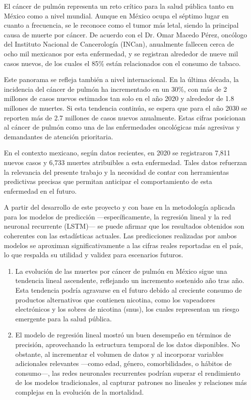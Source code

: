 El cáncer de pulmón representa un reto crítico para la salud pública tanto en México como a nivel mundial. Aunque en México ocupa el séptimo lugar en cuanto a frecuencia, se le reconoce como el tumor más letal, siendo la principal causa de muerte por cáncer. De acuerdo con el Dr. Omar Macedo Pérez, oncólogo del Instituto Nacional de Cancerología (INCan), anualmente fallecen cerca de ocho mil mexicanos por esta enfermedad, y se registran alrededor de nueve mil casos nuevos, de los cuales el 85\% están relacionados con el consumo de tabaco.

Este panorama se refleja también a nivel internacional. En la última década, la incidencia del cáncer de pulmón ha incrementado en un 30\%, con más de 2 millones de casos nuevos estimados tan solo en el año 2020 y alrededor de 1.8 millones de muertes. Si esta tendencia continúa, se espera que para el año 2030 se reporten más de 2.7 millones de casos nuevos anualmente. Estas cifras posicionan al cáncer de pulmón como una de las enfermedades oncológicas más agresivas y demandantes de atención prioritaria.

En el contexto mexicano, según datos recientes, en 2020 se registraron 7,811 nuevos casos y 6,733 muertes atribuibles a esta enfermedad. Tales datos refuerzan la relevancia del presente trabajo y la necesidad de contar con herramientas predictivas precisas que permitan anticipar el comportamiento de esta enfermedad en el futuro.

A partir del desarrollo de este proyecto y con base en la metodología aplicada para los modelos de predicción ---específicamente, la regresión lineal y la red neuronal recurrente (LSTM)--- se puede afirmar que los resultados obtenidos son coherentes con las estadísticas actuales. Las predicciones realizadas por ambos modelos se aproximan significativamente a las cifras reales reportadas en el país, lo que respalda su utilidad y validez para escenarios futuros.

\begin{enumerate}
    \item La evolución de las muertes por cáncer de pulmón en México sigue una tendencia lineal ascendente, reflejando un incremento sostenido año tras año. Esta tendencia podría agravarse en el futuro debido al creciente consumo de productos alternativos que contienen nicotina, como los vapeadores electrónicos y los sobres de nicotina (snus), los cuales representan un riesgo emergente para la salud pública.
    
    \item El modelo de regresión lineal mostró un buen desempeño en términos de precisión, aprovechando la estructura temporal de los datos disponibles. No obstante, al incrementar el volumen de datos y al incorporar variables adicionales relevantes ---como edad, género, comorbilidades, o hábitos de consumo---, las redes neuronales recurrentes podrían superar el rendimiento de los modelos tradicionales, al capturar patrones no lineales y relaciones más complejas en la evolución de la mortalidad.
\end{enumerate}

